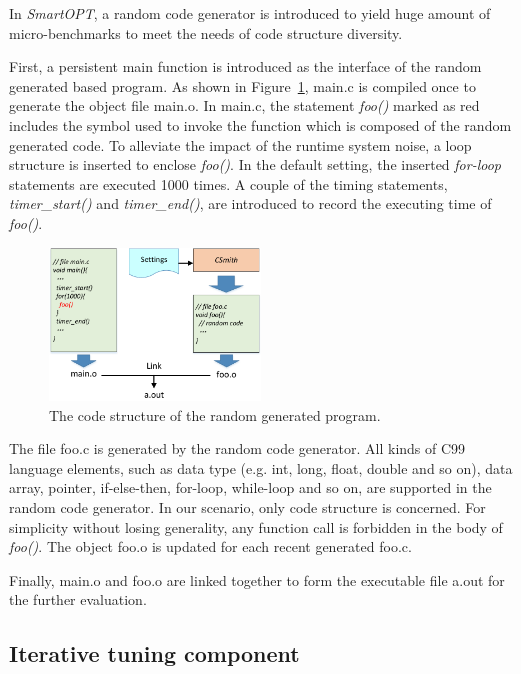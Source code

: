 \documentclass[bst/sn-mathphys]{sn-jnl}%
\theoremstyle{thmstyleone}%
\theoremstyle{thmstyletwo}%
\theoremstyle{thmstylethree}%
\begin{document}
In \emph{SmartOPT}, a random code generator is introduced to yield huge amount 
of micro-benchmarks to meet the needs of code structure diversity.

First, a persistent main function is introduced as the interface of the random 
generated based program. As shown in Figure~\ref{FIG2}, main.c is compiled 
once to generate the object file main.o. In main.c, the statement 
\emph{foo()} marked as red includes the symbol used to invoke the function 
which is composed of the random generated code. To alleviate the impact of the 
runtime system noise, a loop structure is inserted to enclose \emph{foo()}. In 
the default setting, the inserted \emph{for-loop} statements are executed 1000 
times. A couple of 
the timing statements, \emph{timer\_start()} and \emph{timer\_end()}, are 
introduced to record the executing time of \emph{foo()}. 

\begin{figure}[h]%
\centering
\includegraphics[width=0.5\textwidth]{fig/fig2.pdf}
\caption{The code structure of the random generated program.}\label{FIG2}
\end{figure}

The file foo.c is generated by the random code generator.  
All kinds of C99 language elements, such as data type (e.g. int, long, 
float, double and so on), data array, pointer, if-else-then, for-loop, 
while-loop and so on, are supported in the random code generator. In our 
scenario, only code structure is concerned. For simplicity without losing 
generality, any function call is 
forbidden in the body of \emph{foo()}. The object foo.o is updated for each 
recent generated foo.c.

Finally, main.o and foo.o are linked together to form the executable file a.out 
for the further evaluation.

\subsection{Iterative tuning component}\label{sec0402}
\end{document}
